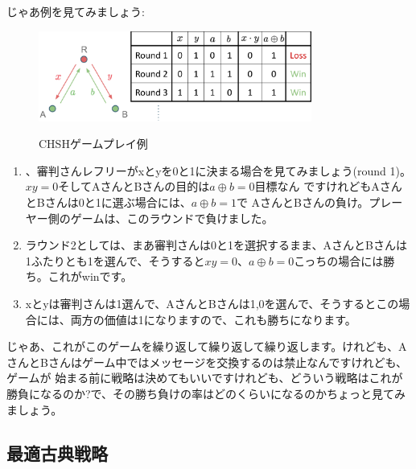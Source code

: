 じゃあ例を見てみましょう:
\begin{figure}[H]
    \centering
    \includegraphics[width=0.8\textwidth]{lesson4/CHSH_rounds.pdf}
    \label{fig: 1}
    \begin{center}
        \caption{CHSHゲームプレイ例}
    \end{center}
\end{figure}
\begin{enumerate}
    \item 、審判さんレフリーがxとyを0と1に決まる場合を見てみましょう(round 1)。$x y = 0$そしてAさんとBさんの目的は$a \oplus b = 0$目標なん
ですけれどもAさんとBさんは0と1に選ぶ場合には、$a \oplus b = 1$で
AさんとBさんの負け。プレーヤー側のゲームは、このラウンドで負けました。
    \item ラウンド2としては、まあ審判さんは0と1を選択するまま、AさんとBさんは1ふたりとも1を選んで、そうすると$x y = 0$、$a\oplus b=0$こっちの場合には勝ち。これがwinです。
    \item xとyは審判さんは1選んで、AさんとBさんは1,0を選んで、そうするとこの場合には、両方の価値は1になりますので、これも勝ちになります。

\end{enumerate}
じゃあ、これがこのゲームを繰り返して繰り返して繰り返します。けれども、AさんとBさんはゲーム中ではメッセージを交換するのは禁止なんですけれども、ゲームが
始まる前に戦略は決めてもいいですけれども、どういう戦略はこれが
勝負になるのか?で、その勝ち負けの率はどのくらいになるのかちょっと見てみましょう。
\subsection{最適古典戦略}

